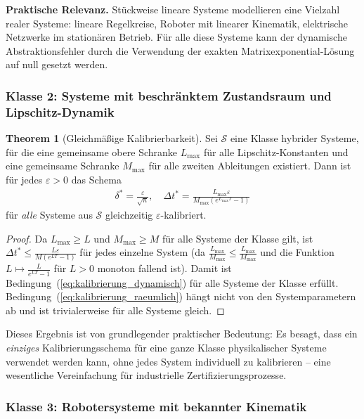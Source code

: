 ﻿\documentclass[a4paper,12pt]{article}
\theoremstyle{definition}
\newtheorem{theorem}{Theorem}[section]
\begin{document}
\textbf{Praktische Relevanz.} Stückweise lineare Systeme modellieren eine Vielzahl realer Systeme: lineare Regelkreise, Roboter mit linearer Kinematik, elektrische Netzwerke im stationären Betrieb. Für alle diese Systeme kann der dynamische Abstraktionsfehler durch die Verwendung der exakten Matrixexponential-Lösung auf null gesetzt werden.

\subsubsection{Klasse 2: Systeme mit beschränktem Zustandsraum und Lipschitz-Dynamik}

\begin{theorem}[Gleichmäßige Kalibrierbarkeit]
\label{thm:gleichmaessig_kalibrierbar}
Sei $\mathcal{S}$ eine Klasse hybrider Systeme, für die eine gemeinsame obere Schranke $L_{\max}$ für alle Lipschitz-Konstanten und eine gemeinsame Schranke $M_{\max}$ für alle zweiten Ableitungen existiert. Dann ist für jedes $\varepsilon > 0$ das Schema
\begin{align}
  \delta^* = \frac{\varepsilon}{\sqrt{n}}, \quad \Delta t^* = \frac{L_{\max}\varepsilon}{M_{\max}(e^{L_{\max}T}-1)}
\end{align}
für \emph{alle} Systeme aus $\mathcal{S}$ gleichzeitig $\varepsilon$-kalibriert.
\end{theorem}

\begin{proof}
Da $L_{\max} \geq L$ und $M_{\max} \geq M$ für alle Systeme der Klasse gilt, ist $\Delta t^* \leq \frac{L\varepsilon}{M(e^{LT}-1)}$ für jedes einzelne System (da $\frac{L_{\max}}{M_{\max}} \leq \frac{L_{\max}}{M_{\max}}$ und die Funktion $L \mapsto \frac{L}{e^{LT}-1}$ für $L > 0$ monoton fallend ist). Damit ist Bedingung~(\ref{eq:kalibrierung_dynamisch}) für alle Systeme der Klasse erfüllt. Bedingung~(\ref{eq:kalibrierung_raeumlich}) hängt nicht von den Systemparametern ab und ist trivialerweise für alle Systeme gleich.
\end{proof}

Dieses Ergebnis ist von grundlegender praktischer Bedeutung: Es besagt, dass ein \emph{einziges} Kalibrierungsschema für eine ganze Klasse physikalischer Systeme verwendet werden kann, ohne jedes System individuell zu kalibrieren -- eine wesentliche Vereinfachung für industrielle Zertifizierungsprozesse.

\subsubsection{Klasse 3: Robotersysteme mit bekannter Kinematik}
\end{document}
